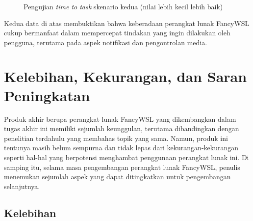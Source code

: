 \begin{figure}
    \centering
\caption{Pengujian \textit{time to task} skenario kedua (nilai lebih kecil lebih baik)}
\label{scenario-2-time-to-task-bar-chart}
\end{figure}

Kedua data di atas membuktikan bahwa keberadaan perangkat lunak FancyWSL cukup bermanfaat dalam mempercepat tindakan yang ingin dilakukan oleh pengguna, terutama pada aspek notifikasi dan pengontrolan media.

\section{Kelebihan, Kekurangan, dan Saran Peningkatan}

Produk akhir berupa perangkat lunak FancyWSL yang dikembangkan dalam tugas akhir ini memiliki sejumlah keunggulan, terutama dibandingkan dengan penelitian terdahulu yang membahas topik yang sama. Namun, produk ini tentunya masih belum sempurna dan tidak lepas dari kekurangan-kekurangan seperti hal-hal yang berpotensi menghambat penggunaan perangkat lunak ini. Di samping itu, selama masa pengembangan perangkat lunak FancyWSL, penulis menemukan sejumlah aspek yang dapat ditingkatkan untuk pengembangan selanjutnya.

\subsection{Kelebihan}

